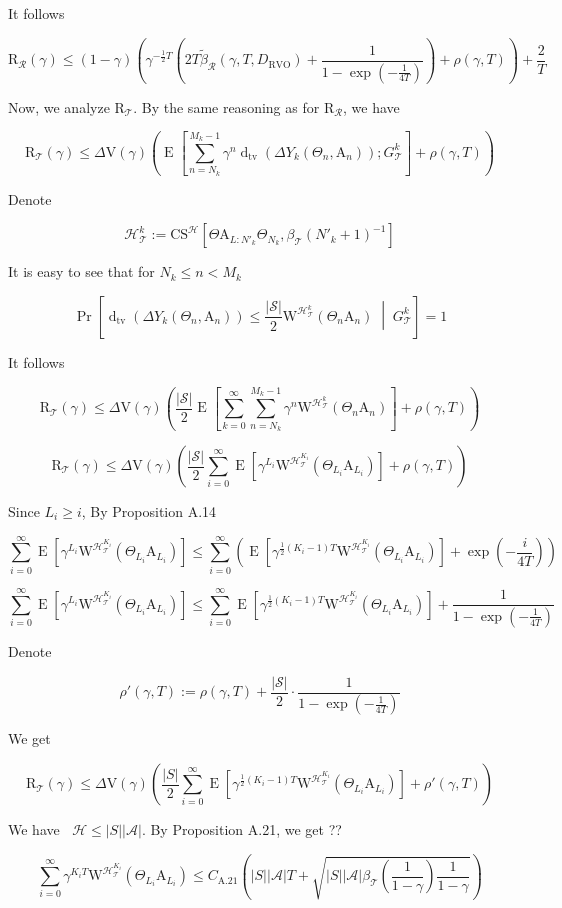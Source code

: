 \documentclass[a4paper]{article}
\newcommand{\AP}[1]{\left(#1\right)}
\newcommand{\AB}[1]{\left[#1\right]}
\newcommand{\ABM}[2]{\left[#1\;\middle\vert\;#2\right]}
\newcommand{\Abs}[1]{\left\vert #1 \right\vert}
\newcommand{\CPb}[2]{\operatorname{Pr}\ABM{#1}{#2}}
\newcommand{\E}[1]{\operatorname{E}\AB{#1}}
\newcommand{\Dtva}[1]{\operatorname{d}_{\text{tv}}\AP{#1}}
\newcommand{\St}{\mathcal{S}}
\newcommand{\A}{\mathcal{A}}
\newcommand{\R}{\mathcal{R}}
\newcommand{\T}{\mathcal{T}}
\newcommand{\Hy}{\mathcal{H}}
\DeclareMathOperator{\RVO}{\dim_{RVO}}
\newcommand{\DRVO}{D_{\mathrm{RVO}}}
\newcommand{\V}{\mathrm{V}}
\newcommand{\Reg}{\mathrm{R}}
\newcommand{\SHy}{Y}
\newcommand{\AT}{\mathrm{A}}
\newcommand{\ET}{N}
\newcommand{\IT}{M}
\newcommand{\CSE}{G}
\newcommand{\CS}{\mathrm{CS}}
\newcommand{\W}{\mathrm{W}}
\begin{document}
It follows

$$\Reg_\R(\gamma)\leq(1-\gamma)\AP{\gamma^{-\frac{1}{2}T}\AP{2T\tilde{\beta}_\R(\gamma,T,\DRVO)+\frac{1}{1-\exp\AP{-\frac{1}{4T}}}}+\rho(\gamma,T)}+\frac{2}{T}$$

Now, we analyze $\Reg_{\T}$. By the same reasoning as for $\Reg_\R$, we have

$$\Reg_\T(\gamma)\leq\Delta\V(\gamma)\AP{\E{\sum_{n=\ET_k}^{\IT_k-1}\gamma^{n}\Dtva{\Delta\SHy_k\AP{\Theta_n,\AT_n}};\CSE_\T^k}+\rho(\gamma,T)}$$

Denote

$$\Hy_\T^k:=\CS^\Hy\AB{\Theta\AT_{L:N'_k}\Theta_{N_k},\beta_\T\AP{N'_k+1}^{-1}}$$

It is easy to see that for $N_k\leq n<M_k$

$$\CPb{\Dtva{\Delta\SHy_k\AP{\Theta_n,\AT_n}}\leq\frac{\Abs{\St}}{2}\W^{\Hy_\T^k}\AP{\Theta_n\AT_n}}{\CSE_\T^k}=1$$

It follows

$$\Reg_\T(\gamma)\leq\Delta\V(\gamma)\AP{\frac{\Abs{\St}}{2}\E{\sum_{k=0}^\infty\sum_{n=\ET_k}^{\IT_k-1}\gamma^{n}\W^{\Hy_\T^k}\AP{\Theta_n\AT_n}}+\rho(\gamma,T)}$$

$$\Reg_\T(\gamma)\leq\Delta\V(\gamma)\AP{\frac{\Abs{\St}}{2}\sum_{i=0}^\infty\E{\gamma^{L_i}\W^{\Hy_\T^{K_i}}\AP{\Theta_{L_i}\AT_{L_i}}}+\rho(\gamma,T)}$$

Since $L_i\geq i$, By Proposition A.14

$$\sum_{i=0}^\infty\E{\gamma^{L_i}\W^{\Hy_\T^{K_i}}\AP{\Theta_{L_i}\AT_{L_i}}}\leq\sum_{i=0}^\infty\AP{\E{\gamma^{\frac{1}{2}\AP{K_i-1}T}\W^{\Hy_\T^{K_i}}\AP{\Theta_{L_i}\AT_{L_i}}}+\exp\AP{-\frac{i}{4T}}}$$

$$\sum_{i=0}^\infty\E{\gamma^{L_i}\W^{\Hy_\T^{K_i}}\AP{\Theta_{L_i}\AT_{L_i}}}\leq\sum_{i=0}^\infty\E{\gamma^{\frac{1}{2}\AP{K_i-1}T}\W^{\Hy_\T^{K_i}}\AP{\Theta_{L_i}\AT_{L_i}}}+\frac{1}{1-\exp\AP{-\frac{1}{4T}}}$$

Denote

$$\rho'(\gamma,T):=\rho(\gamma,T)+\frac{\Abs{\St}}{2}\cdot\frac{1}{1-\exp\AP{-\frac{1}{4T}}}$$

We get

$$\Reg_\T(\gamma)\leq\Delta\V(\gamma)\AP{\frac{\Abs{S}}{2}\sum_{i=0}^\infty\E{\gamma^{\frac{1}{2}\AP{K_i-1}T}\W^{\Hy_\T^{K_i}}\AP{\Theta_{L_i}\AT_{L_i}}}+\rho'(\gamma,T)}$$

We have $\RVO\Hy\leq\Abs{S}\Abs{\A}$. By Proposition A.21, we get ??

$$\sum_{i=0}^\infty\gamma^{K_i T}\W^{\Hy_\T^{K_i}}\AP{\Theta_{L_i}\AT_{L_i}}\leq C_{\text{A.21}}\AP{\Abs{S}\Abs{\A} T+\sqrt{\Abs{S}\Abs{\A}\beta_\T\AP{\frac{1}{1-\gamma}}\frac{1}{1-\gamma}}}$$
\end{document}
